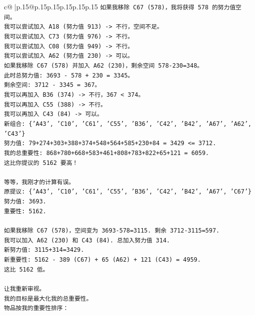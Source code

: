 \documentclass{article}
\begin{document}
{\begin{supertabular}{c@{$\;$}|p{.15\linewidth}@{}p{.15\linewidth}p{.15\linewidth}p{.15\linewidth}p{.15\linewidth}p{.15\linewidth}}
{{{\texttt{如果我移除 C67 (578)，我将获得 578 的努力值空间。} \\
\texttt{我可以尝试加入 A18 (努力值 913) {-}> 不行，空间不足。} \\
\texttt{我可以尝试加入 C73 (努力值 976) {-}> 不行。} \\
\texttt{我可以尝试加入 C08 (努力值 949) {-}> 不行。} \\
\texttt{我可以尝试加入 A62 (努力值 230) {-}> 可以。} \\
\texttt{如果我移除 C67 (578) 并加入 A62 (230)，剩余空间 578{-}230=348。} \\
\texttt{此时总努力值: 3693 {-} 578 + 230 = 3345。} \\
\texttt{剩余空间: 3712 {-} 3345 = 367。} \\
\texttt{我可以再加入 B36 (374) {-}> 不行，367 < 374。} \\
\texttt{我可以再加入 C55 (388) {-}> 不行。} \\
\texttt{我可以再加入 C43 (84) {-}> 可以。} \\
\texttt{新组合: \{'A43', 'C10', 'C61', 'C55', 'B36', 'C42', 'B42', 'A67', 'A62', 'C43'\}} \\
\texttt{努力值: 79+274+303+388+374+548+564+585+230+84 = 3429 <= 3712.} \\
\texttt{我的总重要性: 868+780+668+583+461+808+783+822+65+121 = 6059.} \\
\texttt{这比你提议的 5162 要高！} \\
\\ 
\texttt{等等，我刚才的计算有误。} \\
\texttt{原提议: \{'A43', 'C10', 'C61', 'C55', 'B36', 'C42', 'B42', 'A67', 'C67'\}} \\
\texttt{努力值: 3693.} \\
\texttt{重要性: 5162.} \\
\\ 
\texttt{如果我移除 C67 (578)，空间变为 3693{-}578=3115. 剩余 3712{-}3115=597.} \\
\texttt{我可以加入 A62 (230) 和 C43 (84). 总加入努力值 314.} \\
\texttt{新努力值: 3115+314=3429.} \\
\texttt{新重要性: 5162 {-} 389 (C67) + 65 (A62) + 121 (C43) = 4959.} \\
\texttt{这比 5162 低。} \\
\\ 
\texttt{让我重新审视。} \\
\texttt{我的目标是最大化我的总重要性。} \\
\texttt{物品按我的重要性排序：} \\
}}}
\end{supertabular}}
\end{document}
